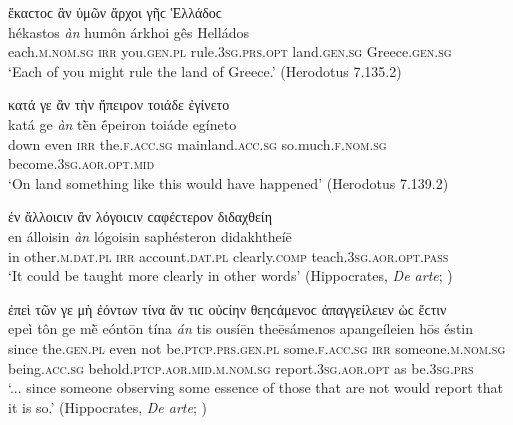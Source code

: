 \newpage

\begin{exe}
\ex ἕκαϲτοϲ ἂν ὑμῶν ἄρχοι γῆϲ Ἑλλάδοϲ\\
\gll hékastos \emph{àn} humôn árkhoi gês Helládos\\
each.\textsc{m.nom.sg} \textsc{irr} you.\textsc{gen.pl} rule.\textsc{3sg.prs.opt} land.\textsc{gen.sg} Greece.\textsc{gen.sg}\\
\trans `Each of you might rule the land of Greece.' (Herodotus 7.135.2)
\label{wordgroup13}
\end{exe}

\begin{exe}
\ex κατά γε ἂν τὴν ἤπειρον τοιάδε ἐγίνετο\\
\gll katá ge \emph{àn} tḕn ḗpeiron toiáde egíneto\\
down even \textsc{irr} the.\textsc{f.acc.sg} mainland.\textsc{acc.sg} so.much.\textsc{f.nom.sg} become.\textsc{3sg.aor.opt.mid}\\
\trans `On land something like this would have happened' (Herodotus 7.139.2)
\label{wordgroup14}
\end{exe}

\begin{exe}
\ex ἐν ἄλλοιϲιν ἂν λόγοιϲιν ϲαφέϲτερον διδαχθείη\\
\gll en álloisin \emph{àn} lógoisin saphésteron didakhtheíē\\
in other.\textsc{m.dat.pl} \textsc{irr} account.\textsc{dat.pl} clearly.\textsc{comp} teach.\textsc{3sg.aor.opt.pass}\\
\trans `It could be taught more clearly in other words' (Hippocrates, \textit{De arte}; \citealp[44, line 8]{Gomperz1890})
\label{wordgroup15}
\end{exe}

\begin{exe}
\ex ἐπεὶ τῶν γε μὴ ἐόντων τίνα ἄν τιϲ οὐϲίην θεηϲάμενοϲ ἀπαγγείλειεν ὡϲ ἔϲτιν\\
\gll epeì tôn ge mḕ eóntōn tína \emph{án} tis ousíēn theēsámenos apangeíleien hōs éstin\\
since the.\textsc{gen.pl} even not be.\textsc{ptcp.prs.gen.pl} some.\textsc{f.acc.sg} \textsc{irr} someone.\textsc{m.nom.sg} being.\textsc{acc.sg} behold.\textsc{ptcp.aor.mid.m.nom.sg} report.\textsc{3sg.aor.opt} as be.\textsc{3sg.prs}\\
\trans `... since someone observing some essence of those that are not would report that it is so.' (Hippocrates, \textit{De arte}; \citealp[42, line 19]{Gomperz1890})
\label{wordgroup16}
\end{exe}

